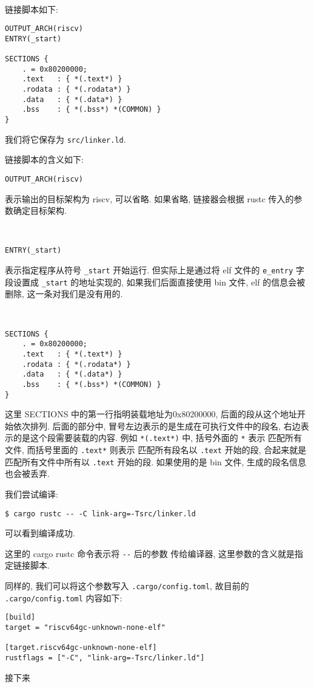 \documentclass[a4paper]{ctexart}
\begin{document}
\
\
\
\


链接脚本如下:
\begin{lstlisting}
OUTPUT_ARCH(riscv)
ENTRY(_start)

SECTIONS {
    . = 0x80200000;
    .text   : { *(.text*) }
    .rodata : { *(.rodata*) }
    .data   : { *(.data*) }
    .bss    : { *(.bss*) *(COMMON) }
}
\end{lstlisting}
我们将它保存为 \verb|src/linker.ld|.

链接脚本的含义如下:
\begin{lstlisting}
OUTPUT_ARCH(riscv)
\end{lstlisting}
表示输出的目标架构为 riscv, 可以省略.
如果省略, 链接器会根据 rustc 传入的参数确定目标架构.

\

\begin{lstlisting}
ENTRY(_start)
\end{lstlisting}
表示指定程序从符号 \verb|_start| 开始运行.
但实际上是通过将 elf 文件的 \verb|e_entry| 字段设置成
\verb|_start| 的地址实现的,
如果我们后面直接使用 bin 文件,
elf 的信息会被删除,
这一条对我们是没有用的.

\

\begin{lstlisting}
SECTIONS {
    . = 0x80200000;
    .text   : { *(.text*) }
    .rodata : { *(.rodata*) }
    .data   : { *(.data*) }
    .bss    : { *(.bss*) *(COMMON) }
}
\end{lstlisting}
这里 SECTIONS 中的第一行指明装载地址为0x80200000,
后面的段从这个地址开始依次排列.
后面的部分中, 冒号左边表示的是生成在可执行文件中的段名,
右边表示的是这个段需要装载的内容.
例如 \verb|*(.text*)| 中, 括号外面的 \verb|*| 表示
匹配所有文件, 而括号里面的 \verb|.text*| 则表示
匹配所有段名以 \verb|.text| 开始的段,
合起来就是匹配所有文件中所有以 \verb|.text| 开始的段.
如果使用的是 bin 文件, 生成的段名信息也会被丢弃.

我们尝试编译:
\begin{lstlisting}
$ cargo rustc -- -C link-arg=-Tsrc/linker.ld
\end{lstlisting}
可以看到编译成功.

这里的 cargo rustc 命令表示将 \verb|--| 后的参数
传给编译器, 这里参数的含义就是指定链接脚本.

同样的, 我们可以将这个参数写入 \verb|.cargo/config.toml|,
故目前的 \verb|.cargo/config.toml| 内容如下:
\begin{lstlisting}
[build]
target = "riscv64gc-unknown-none-elf"

[target.riscv64gc-unknown-none-elf]
rustflags = ["-C", "link-arg=-Tsrc/linker.ld"]
\end{lstlisting}

接下来
\end{document}
